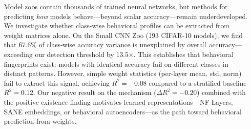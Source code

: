 Model zoos contain thousands of trained neural networks, but methods for predicting \emph{how} models behave---beyond scalar accuracy---remain underdeveloped. We investigate whether class-wise behavioral profiles can be extracted from weight matrices alone. On the Small CNN Zoo (193 CIFAR-10 models), we find that 67.6\% of class-wise accuracy variance is unexplained by overall accuracy---exceeding our detection threshold by 13.5$\times$. This establishes that behavioral fingerprints exist: models with identical accuracy fail on different classes in distinct patterns. However, simple weight statistics (per-layer mean, std, norm) fail to extract this signal, achieving $R^2 = -0.08$ compared to a stratified baseline $R^2 = 0.12$. Our negative result on the mechanism ($\Delta R^2 = -0.20$) combined with the positive existence finding motivates learned representations---NF-Layers, SANE embeddings, or behavioral autoencoders---as the path toward behavioral prediction from weights.
